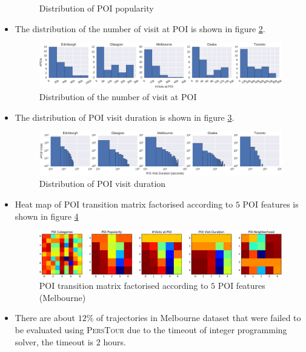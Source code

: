 \begin{itemize}
\begin{figure}
      \caption{Distribution of POI popularity}
      \label{fig:popularity}
      \end{figure}
\item The distribution of the number of visit at POI is shown in figure \ref{fig:nvisit}.
      \begin{figure}
      \includegraphics[width=\textwidth]{fig/poi_nvisit.pdf}
      \caption{Distribution of the number of visit at POI}
      \label{fig:nvisit}
      \end{figure}
\item The distribution of POI visit duration is shown in figure \ref{fig:duration}.
      \begin{figure}
      \includegraphics[width=\textwidth]{fig/visit_duration.pdf}
      \caption{Distribution of POI visit duration}
      \label{fig:duration}
      \end{figure}
\item Heat map of POI transition matrix factorised according to $5$ POI features is shown in figure \ref{fig:transmat}
      \begin{figure}
      \includegraphics[width=\textwidth]{fig/poi_transmat.pdf}
      \caption{POI transition matrix factorised according to $5$ POI features (Melbourne)}
      \label{fig:transmat}
      \end{figure}
\item There are about $12$\% of trajectories in Melbourne dataset that were failed to be evaluated 
      using \textsc{PersTour} due to the timeout of integer programming solver, the timeout is $2$ hours.
\end{itemize}
